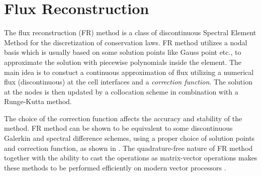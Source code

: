 \section{Flux Reconstruction}
The flux reconstruction (FR) method is a class of discontinuous Spectral Element Method for the discretization of conservation laws. FR method utilizes a nodal basis which is usually based on some solution points like Gauss point etc., to approximate the solution with piecewise polynomials inside the element. The main idea is to constuct a continuous approximation of flux utilizing a numerical flux (discontinuous) at the cell interfaces and a {\em correction function}. The solution at the nodes is then updated by a collocation scheme in combination with a Runge-Kutta method.

The choice of the correction function affects the accuracy and stability of the method. FR method can be shown to be equivalent to some discontinuous Galerkin and spectral difference schemes, using a proper choice of solution points and correction function, as shown in \cite{trojak, hyunh}. The quadrature-free nature of FR method together with the ability to cast the operations as matrix-vector operations makes these methods to be performed efficiently on modern vector processors \cite{vincent}.

